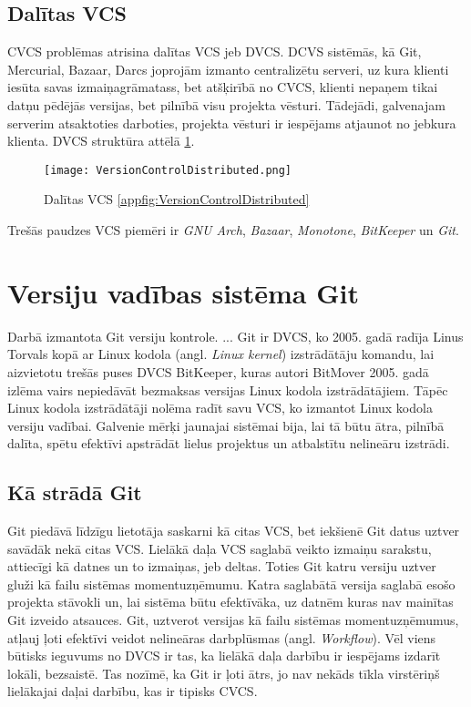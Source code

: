 \subsection{Dalītas VCS}
CVCS problēmas atrisina dalītas VCS jeb DVCS. DCVS sistēmās, kā Git, Mercurial, Bazaar, Darcs joprojām izmanto centralizētu serveri, uz kura klienti iesūta savas izmaiņagrāmatass, bet atšķirībā no CVCS, klienti nepaņem tikai datņu pēdējās versijas, bet pilnībā visu projekta vēsturi. Tādejādi, galvenajam serverim atsaktoties darboties, projekta vēsturi ir iespējams atjaunot no jebkura klienta. DVCS struktūra attēlā \ref{fig:VersionControlDistributed}.
\begin{figure}[H]%
	\centering
	\captionsetup{justification=centering}
	\texttt{[image: VersionControlDistributed.png]}
	\caption{Dalītas VCS \ref{appfig:VersionControlDistributed}}
	\label{fig:VersionControlDistributed}
\end{figure}
Trešās paudzes VCS piemēri ir \textit{GNU Arch}, \textit{Bazaar}, \textit{Monotone}, \textit{BitKeeper} un \textit{Git}.

\section{Versiju vadības sistēma Git}
Darbā izmantota Git versiju kontrole. ... %
Git ir DVCS, ko 2005. gadā radīja Linus Torvals kopā ar Linux kodola (angl. \textit{Linux kernel}) izstrādātāju komandu, lai aizvietotu trešās puses DVCS BitKeeper, kuras autori BitMover 2005. gadā izlēma vairs nepiedāvāt bezmaksas versijas Linux kodola izstrādātājiem. Tāpēc Linux kodola izstrādātāji nolēma radīt savu VCS, ko izmantot Linux kodola versiju vadībai. Galvenie mērķi jaunajai sistēmai bija, lai tā būtu ātra, pilnībā dalīta, spētu efektīvi apstrādāt lielus projektus un atbalstītu nelineāru izstrādi.

\subsection{Kā strādā Git}
Git piedāvā līdzīgu lietotāja saskarni kā citas VCS, bet iekšienē Git datus uztver savādāk nekā citas VCS. Lielākā daļa VCS saglabā veikto izmaiņu sarakstu, attiecīgi kā datnes un to izmaiņas, jeb deltas.
Toties Git katru versiju uztver gluži kā failu sistēmas momentuzņēmumu. Katra saglabātā versija saglabā esošo projekta stāvokli un, lai sistēma būtu efektīvāka, uz datnēm kuras nav mainītas Git izveido atsauces. Git, uztverot versijas kā failu sistēmas momentuzņēmumus, atļauj ļoti efektīvi veidot nelineāras darbplūsmas (angl. \textit{Workflow}).
Vēl viens būtisks ieguvums no DVCS ir tas, ka lielākā daļa darbību ir iespējams izdarīt lokāli, bezsaistē. Tas nozīmē, ka Git ir ļoti ātrs, jo nav nekāds tīkla virstēriņš lielākajai daļai darbību, kas ir tipisks CVCS.

